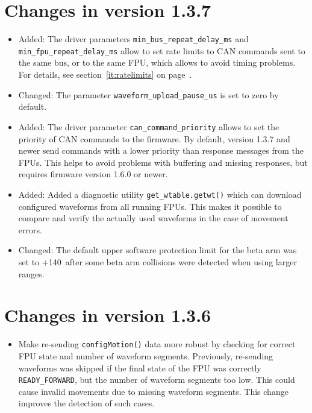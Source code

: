 \documentclass[fontsize=12,a4paper]{scrreprt}
\begin{document}
\section*{Changes in version 1.3.7}
\begin{itemize}
\item
  Added: The driver parameters \texttt{min\_bus\_repeat\_delay\_ms} and
  \texttt{min\_fpu\_repeat\_delay\_ms} allow to set rate limits to CAN
  commands sent to the same bus, or to the same FPU, which allows to
  avoid timing problems. For details, see section~\ref{it:ratelimits}
  on page~\pageref{it:ratelimits}.

\item Changed: The parameter \texttt{waveform\_upload\_pause\_us} is
  set to zero by default.

\item Added: The driver parameter \texttt{can\_command\_priority} allows to
  set the priority of CAN commands to the firmware. By default,
  version 1.3.7 and newer send commands with a lower priority than
  response messages from the FPUs. This helps to avoid problems with
  buffering and missing responses, but requires firmware version 1.6.0
  or newer.

\item Added: Added a diagnostic utility \texttt{get\_wtable.getwt()}
  which can download configured waveforms from all running FPUs.  This
  makes it possible to compare and verify the actually used waveforms
  in the case of movement errors.

\item Changed: The default upper software protection limit for the
  beta arm was set to +140\degree\ after some beta arm collisions were
  detected when using larger ranges.
\end{itemize}


\section*{Changes in version 1.3.6}
\begin{itemize}
\item Make re-sending \texttt{configMotion()} data more robust by
  checking for correct FPU state and number of waveform segments.
  Previously, re-sending waveforms was skipped if the final state of
  the FPU was correctly \texttt{READY\_FORWARD}, but the number of
  waveform segments too low. This could cause invalid movements due to
  missing waveform segments. This change improves the detection of
  such cases.
\end{itemize}
\end{document}
